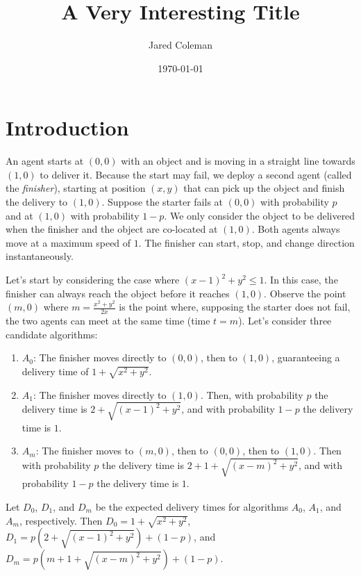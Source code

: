 \documentclass{article}
\title{A Very Interesting Title}
\author[1]{Jared Coleman}
\affil[1]{Loyola Marymount University}
\date{\today}
\begin{document}
\maketitle

\begin{abstract}
\lipsum[1]
\end{abstract}


\section{Introduction}

An agent starts at $(0, 0)$ with an object and is moving in a straight line towards $(1,0)$ to deliver it.
Because the start may fail, we deploy a second agent (called the \textit{finisher}), starting at position $(x,y)$ that can pick up the object and finish the delivery to $(1,0)$.
Suppose the starter fails at $(0,0)$ with probability $p$ and at $(1,0)$ with probability $1-p$.
We only consider the object to be delivered when the finisher and the object are co-located at $(1,0)$.
Both agents always move at a maximum speed of $1$. The finisher can start, stop, and change direction instantaneously.

Let's start by considering the case where $(x-1)^2 + y^2 \leq 1$.
In this case, the finisher can always reach the object before it reaches $(1,0)$.
Observe the point $(m, 0)$ where $m = \frac{x^2 + y^2}{2x}$ is the point where, supposing the starter does not fail, the two agents can meet at the same time (time $t = m$).
Let's consider three candidate algorithms:
\begin{enumerate}
    \item $A_0$: The finisher moves directly to $(0,0)$, then to $(1,0)$, guaranteeing a delivery time of $1+\sqrt{x^2 + y^2}$.
    \item $A_1$: The finisher moves directly to $(1,0)$. Then, with probability $p$ the delivery time is $2+\sqrt{(x-1)^2 + y^2}$, and with probability $1-p$ the delivery time is $1$.
    \item $A_m$: The finisher moves to $(m,0)$, then to $(0,0)$, then to $(1,0)$. Then with probability $p$ the delivery time is $2 + 1 + \sqrt{(x-m)^2 + y^2}$, and with probability $1-p$ the delivery time is $1$.
\end{enumerate}
Let $D_0$, $D_1$, and $D_m$ be the expected delivery times for algorithms $A_0$, $A_1$, and $A_m$, respectively.
Then $D_0 = 1 + \sqrt{x^2 + y^2}$, $D_1 = p(2 + \sqrt{(x-1)^2 + y^2}) + (1-p)$, and $D_m = p(m + 1 + \sqrt{(x-m)^2 + y^2}) + (1-p)$.
\end{document}
